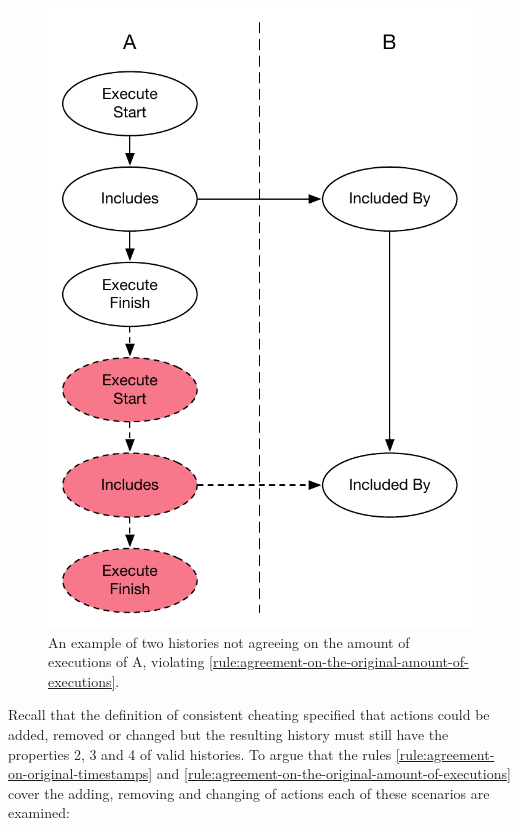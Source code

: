 \begin{figure}[H]
\begin{minipage}{.45\textwidth}
			\includegraphics[width=\textwidth]{6validation/images/agreement-on-original-amount-of-executions-2.pdf}
			\caption{An example of two histories not agreeing on the amount of executions of A, violating \autoref{rule:agreement-on-the-original-amount-of-executions}.}
			\label{fig:agreement-on-the-original-amount-of-executions-2}
		\end{minipage}
	\end{figure}
	
	\newpar Recall that the definition of consistent cheating specified that actions could be added, removed or changed but the resulting history must still have the properties 2, 3 and 4 of valid histories. To argue that the rules \ref{rule:agreement-on-original-timestamps} and \ref{rule:agreement-on-the-original-amount-of-executions} cover the adding, removing and changing of actions each of these scenarios are examined:
	
